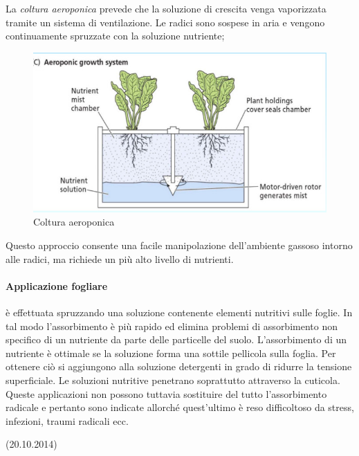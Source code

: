 \documentclass[a4paper,12pt]{book}
\begin{document}
La \emph{coltura aeroponica} prevede che la soluzione di crescita venga vaporizzata tramite un sistema di ventilazione. Le radici sono sospese in aria e vengono continuamente spruzzate con la soluzione nutriente;
\begin{figure}[H]
\centering
\includegraphics[scale=0.4]{immagini/aeroponica.jpg}
\caption{Coltura aeroponica}
\end{figure}
Questo approccio consente una facile manipolazione dell'ambiente gassoso intorno alle radici, ma richiede un più alto livello di nutrienti.

\paragraph{Applicazione fogliare} è effettuata spruzzando una soluzione contenente elementi nutritivi sulle foglie. In tal modo
l’assorbimento è più rapido ed elimina problemi di assorbimento non specifico di un nutriente da
parte delle particelle del suolo. L’assorbimento di un nutriente è ottimale se la soluzione forma una
sottile pellicola sulla foglia. Per ottenere ciò si aggiungono alla soluzione detergenti in grado di
ridurre la tensione superficiale. Le soluzioni nutritive penetrano soprattutto attraverso la cuticola.
Queste applicazioni non possono tuttavia sostituire del tutto l’assorbimento radicale e pertanto
sono indicate allorché quest’ultimo è reso difficoltoso da stress, infezioni, traumi radicali ecc.

(20.10.2014)
\end{document}

